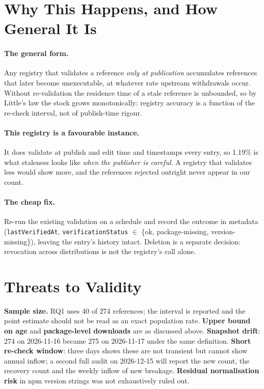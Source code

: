 \documentclass[acmsmall,screen,review,anonymous]{acmart}
\begin{document}
\section{Why This Happens, and How General It Is}
\paragraph{The general form.} Any registry that validates a reference \emph{only at
publication} accumulates references that later become unexecutable, at whatever rate
upstream withdrawals occur. Without re-validation the residence time of a stale reference
is unbounded, so by Little's law the stock grows monotonically: registry accuracy is a
function of the re-check interval, not of publish-time rigour.

\paragraph{This registry is a favourable instance.} It does validate at publish and edit
time and timestamps every entry, so 1.19\% is what staleness looks like \emph{when the
publisher is careful}. A registry that validates less would show more, and the references
rejected outright never appear in our count.

\paragraph{The cheap fix.} Re-run the existing validation on a schedule and record the
outcome in metadata (\texttt{lastVerifiedAt}, \texttt{verificationStatus} $\in$ \{ok,
package-missing, version-missing\}), leaving the entry's history intact. Deletion is a
separate decision: revocation across distributions is not the registry's call alone.

\section{Threats to Validity}
\textbf{Sample size.} RQ1 uses 40 of 274 references; the interval is reported and the point
estimate should not be read as an exact population rate. \textbf{Upper bound on age} and
\textbf{package-level downloads} are as discussed above. \textbf{Snapshot drift}: 274 on
2026-11-16 became 275 on 2026-11-17 under the same definition. \textbf{Short re-check
window}: three days shows these are not transient but cannot show annual inflow; a second
full audit on 2026-12-15 will report the new count, the recovery count and the weekly inflow
of new breakage. \textbf{Residual normalisation risk} in npm version strings was not
exhaustively ruled out.
\end{document}
